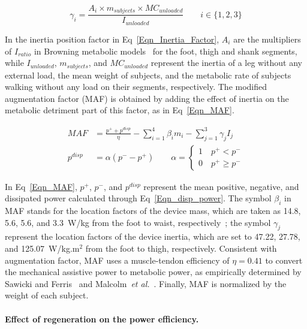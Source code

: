 \documentclass[10pt,letterpaper]{article}
\newcommand{\etal}{\textit{et al.}}
\begin{document}
\begin{equation}\label{Eqn_Inertia_Factor}
\gamma_{i} = \frac{A_i\times m_{subjects}\times MC_{unloaded}}{I_{unloaded}} \qquad i \in \{1,2,3\}
\end{equation}

In the inertia position factor in Eq~\eqref{Eqn_Inertia_Factor}, $A_i$ are the multipliers of $I_{ratio}$ in Browning metabolic models~\cite{Browning2007} for the foot, thigh and shank segments, while $I_{unloaded}$, $m_{subjects}$, and $MC_{unloaded}$ represent the inertia of a leg without any external load, the mean weight of subjects, and the metabolic rate of subjects walking without any load on their segments, respectively. The modified augmentation factor (MAF) is obtained by adding the effect of inertia on the metabolic detriment part of this factor, as in Eq~\eqref{Eqn_MAF}.

\begin{align}
MAF &= \frac{p^{+}+p^{disp}}{\eta}-\sum_{i=1}^{4}\beta_{i}m_{i}-\sum_{j=1}^{3}\gamma_{j}I_{j}\label{Eqn_MAF}\\
p^{disp} &= \alpha(p^{-}-p^{+}) \qquad \alpha = \left\{\begin{array}{ll}1\quad p^{+}<p^{-}\\0\quad p^{+}\geq p^{-}\end{array}\right.\label{Eqn_disp_power}
\end{align}

In Eq~\eqref{Eqn_MAF}, $p^{+}$, $p^{-}$, and $p^{disp}$ represent the mean positive, negative, and dissipated power calculated through Eq~\eqref{Eqn_disp_power}. The symbol $\beta_i$ in MAF stands for the location factors of the device mass, which are taken as 14.8, 5.6, 5.6, and 3.3~W/kg from the foot to waist, respectively~\cite{Mooney2014_a,Browning2007}; the symbol $\gamma_j$ represent the location factors of the device inertia, which are set to 47.22, 27.78, and 125.07~W/{kg.m$^2$} from the foot to thigh, respectively. Consistent with augmentation factor, MAF uses a muscle-tendon efficiency of $\eta = 0.41$ to convert the mechanical assistive power to metabolic power, as empirically determined  by Sawicki and Ferris~\cite{Sawicki2008} and Malcolm~\etal~\cite{Malcolm2013}. Finally, MAF  is normalized by the weight of each subject.


\paragraph*{Effect of regeneration on the power efficiency.}
\end{document}
